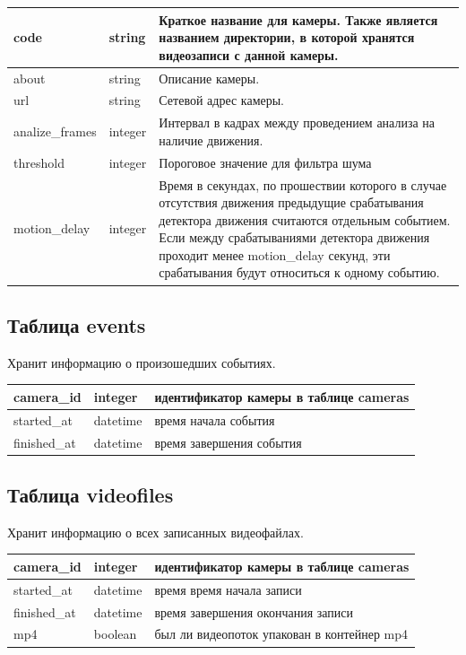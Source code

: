 \begin{center}
\begin{tabular}{ | l | l | p{11cm} |}
\hline
code & string & Краткое название для камеры. Также является названием директории, в которой хранятся видеозаписи с данной камеры. \\ \hline
about & string & Описание камеры. \\ \hline
url & string & Сетевой адрес камеры. \\ \hline
analize\_frames & integer & Интервал в кадрах между проведением анализа на наличие движения. \\ \hline
threshold & integer & Пороговое значение для фильтра шума \\ \hline
motion\_delay & integer & Время в секундах, по прошествии которого в случае отсутствия движения предыдущие срабатывания детектора движения считаются отдельным событием. Если между срабатываниями детектора движения проходит менее motion\_delay секунд, эти срабатывания будут относиться к одному событию. \\ \hline
\end{tabular}
\end{center}

\subsection{Таблица events}
Хранит информацию о произошедших событиях.

\begin{center}
\begin{tabular}{ | l | l | p{11cm} |}
\hline
camera\_id & integer & идентификатор камеры в таблице cameras \\ \hline
started\_at & datetime & время начала события \\ \hline
finished\_at & datetime & время завершения события \\ \hline
\end{tabular}
\end{center}

\subsection{Таблица videofiles}
Хранит информацию о всех записанных видеофайлах.

\begin{center}
\begin{tabular}{ | l | l | p{11cm} |}
\hline
camera\_id & integer & идентификатор камеры в таблице cameras \\ \hline
started\_at & datetime & время время начала записи \\ \hline
finished\_at & datetime & время завершения окончания записи \\ \hline
mp4 & boolean & был ли видеопоток упакован в контейнер mp4 \\ \hline
\end{tabular}
\end{center}
